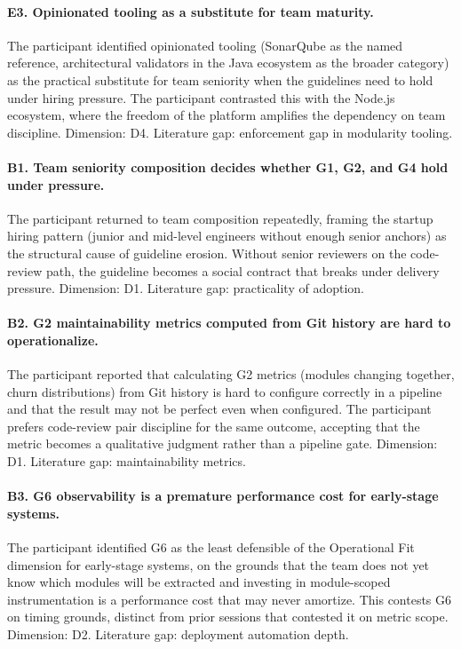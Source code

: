 \paragraph*{E3. Opinionated tooling as a substitute for team maturity.} The participant identified opinionated tooling (SonarQube as the named reference, architectural validators in the Java ecosystem as the broader category) as the practical substitute for team seniority when the guidelines need to hold under hiring pressure. The participant contrasted this with the Node.js ecosystem, where the freedom of the platform amplifies the dependency on team discipline. Dimension: D4. Literature gap: enforcement gap in modularity tooling.

\paragraph*{B1. Team seniority composition decides whether G1, G2, and G4 hold under pressure.} The participant returned to team composition repeatedly, framing the startup hiring pattern (junior and mid-level engineers without enough senior anchors) as the structural cause of guideline erosion. Without senior reviewers on the code-review path, the guideline becomes a social contract that breaks under delivery pressure. Dimension: D1. Literature gap: practicality of adoption.

\paragraph*{B2. G2 maintainability metrics computed from Git history are hard to operationalize.} The participant reported that calculating G2 metrics (modules changing together, churn distributions) from Git history is hard to configure correctly in a pipeline and that the result may not be perfect even when configured. The participant prefers code-review pair discipline for the same outcome, accepting that the metric becomes a qualitative judgment rather than a pipeline gate. Dimension: D1. Literature gap: maintainability metrics.

\paragraph*{B3. G6 observability is a premature performance cost for early-stage systems.} The participant identified G6 as the least defensible of the Operational Fit dimension for early-stage systems, on the grounds that the team does not yet know which modules will be extracted and investing in module-scoped instrumentation is a performance cost that may never amortize. This contests G6 on timing grounds, distinct from prior sessions that contested it on metric scope. Dimension: D2. Literature gap: deployment automation depth.

